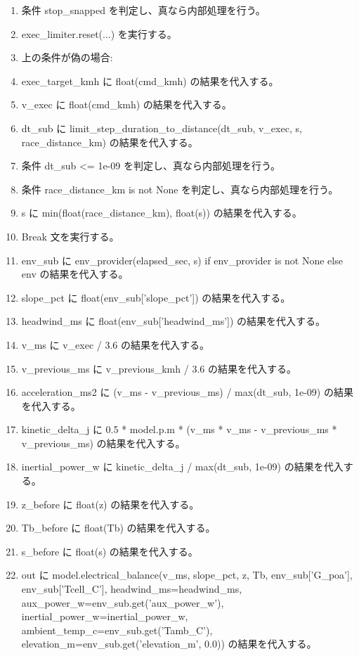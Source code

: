\documentclass[a4paper,11pt]{article}
\begin{document}
\begin{enumerate}[leftmargin=1.8em]
\item     条件 stop\_snapped を判定し、真なら内部処理を行う。
\item       exec\_limiter.reset(...) を実行する。
\item     上の条件が偽の場合:
\item     exec\_target\_kmh に float(cmd\_kmh) の結果を代入する。
\item     v\_exec に float(cmd\_kmh) の結果を代入する。
\item     dt\_sub に limit\_step\_duration\_to\_distance(dt\_sub, v\_exec, s, race\_distance\_km) の結果を代入する。
\item   条件 dt\_sub <= 1e-09 を判定し、真なら内部処理を行う。
\item     条件 race\_distance\_km is not None を判定し、真なら内部処理を行う。
\item       s に min(float(race\_distance\_km), float(s)) の結果を代入する。
\item     Break 文を実行する。
\item   env\_sub に env\_provider(elapsed\_sec, s) if env\_provider is not None else env の結果を代入する。
\item   slope\_pct に float(env\_sub['slope\_pct']) の結果を代入する。
\item   headwind\_ms に float(env\_sub['headwind\_ms']) の結果を代入する。
\item   v\_ms に v\_exec / 3.6 の結果を代入する。
\item   v\_previous\_ms に v\_previous\_kmh / 3.6 の結果を代入する。
\item   acceleration\_ms2 に (v\_ms - v\_previous\_ms) / max(dt\_sub, 1e-09) の結果を代入する。
\item   kinetic\_delta\_j に 0.5 * model.p.m * (v\_ms * v\_ms - v\_previous\_ms * v\_previous\_ms) の結果を代入する。
\item   inertial\_power\_w に kinetic\_delta\_j / max(dt\_sub, 1e-09) の結果を代入する。
\item   z\_before に float(z) の結果を代入する。
\item   Tb\_before に float(Tb) の結果を代入する。
\item   s\_before に float(s) の結果を代入する。
\item   out に model.electrical\_balance(v\_ms, slope\_pct, z, Tb, env\_sub['G\_poa'], env\_sub['Tcell\_C'], headwind\_ms=headwind\_ms, aux\_power\_w=env\_sub.get('aux\_power\_w'), inertial\_power\_w=inertial\_power\_w, ambient\_temp\_c=env\_sub.get('Tamb\_C'), elevation\_m=env\_sub.get('elevation\_m', 0.0)) の結果を代入する。

\end{enumerate}
\end{document}
